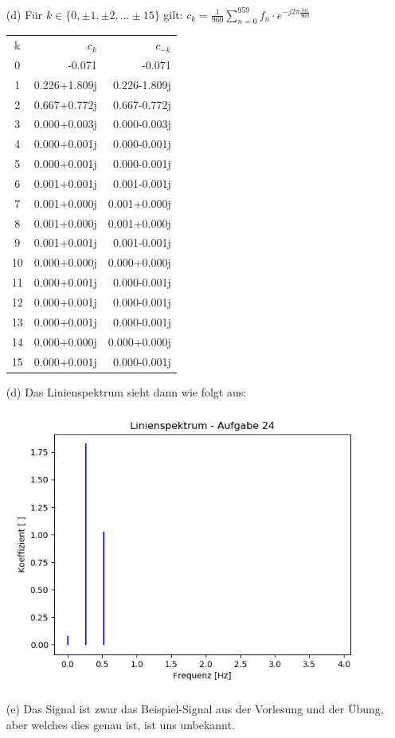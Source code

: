 \begin{itemize}
			\item[(d)] Für $k\in\{ 0, \pm 1, \pm 2, \dots \pm 15 \}$ gilt:
				$c_k = \frac{1}{960}\sum_{n=0}^{959} f_n\cdot e^{-j2\pi\frac{kn}{960}}$\\
			\begin{tabular}{c r r}
				k	&	$c_k$				&	$c_{-k}$\\
				0	&	-0.071				&	-0.071\\
				1	&	 0.226+1.809j		&	0.226-1.809j\\
				2	&	 0.667+0.772j		&	0.667-0.772j\\
				3	&	 0.000+0.003j		&	0.000-0.003j\\
				4	&	 0.000+0.001j		&	0.000-0.001j\\
				5	&	 0.000+0.001j		&	0.000-0.001j\\
				6	&	 0.001+0.001j		&	0.001-0.001j\\
				7	&	 0.001+0.000j		&	0.001+0.000j\\
				8	&	 0.001+0.000j		&	0.001+0.000j\\
				9	&	 0.001+0.001j		&	0.001-0.001j\\
				10	&	 0.000+0.000j		&	0.000+0.000j\\
				11	&	 0.000+0.001j		&	0.000-0.001j\\
				12	&	 0.000+0.001j		&	0.000-0.001j\\
				13	&	 0.000+0.001j		&	0.000-0.001j\\
				14	&	 0.000+0.000j		&	0.000+0.000j\\
				15	&	 0.000+0.001j		&	0.000-0.001j
			\end{tabular}
		\item[(d)] Das Linienspektrum sieht dann wie folgt aus:\\
			\includegraphics[scale = 0.7]{A24_Linienspektrum.png}
		\item[(e)] Das Signal ist zwar das Beispiel-Signal aus der Vorlesung und der Übung, aber welches dies genau ist, ist uns unbekannt.	
	\end{itemize}
\newpage
